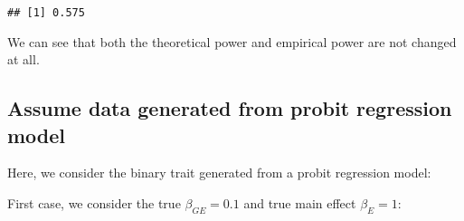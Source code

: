 \documentclass[
]{article}
\begin{document}
\begin{verbatim}
## [1] 0.575
\end{verbatim}

We can see that both the theoretical power and empirical power are not
changed at all.

\hypertarget{assume-data-generated-from-probit-regression-model}{%
\subsection{Assume data generated from probit regression
model}\label{assume-data-generated-from-probit-regression-model}}

Here, we consider the binary trait generated from a probit regression
model:

First case, we consider the true \(\beta_{GE} = 0.1\) and true main
effect \(\beta_E=1\):
\end{document}
